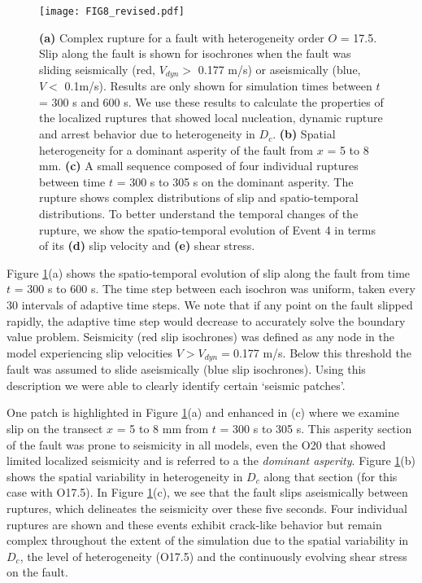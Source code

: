 \documentclass[preprint,1p, 10pt,authoryear]{elsarticle}
\begin{document}
\begin{figure}
	\centering
	\texttt{[image: FIG8\_revised.pdf]} 
	\caption{\textbf{(a)} Complex rupture for a fault with heterogeneity order $O$ = 17.5. Slip along the fault is shown for isochrones when the fault was sliding seismically (red, $V_{dyn}>$ 0.177 m/s) or aseismically (blue, $V <$ 0.1m/s).  Results are only shown for simulation times between $t$ = 300 s and 600 s. We use these results to calculate the properties of the localized ruptures that showed local nucleation, dynamic rupture and arrest behavior due to heterogeneity in $D_{c}$. \textbf{(b)} Spatial heterogeneity for a dominant asperity of the fault from $x$ = 5 to 8 mm. \textbf{(c)} A small sequence composed of four individual ruptures between time $t$ = 300 s to 305 s on the dominant asperity. The rupture shows complex distributions of slip and spatio-temporal distributions. To better understand the temporal changes of the rupture, we show the spatio-temporal evolution of Event 4 in terms of its \textbf{(d)} slip velocity and \textbf{(e)} shear stress.}
	\label{fig8}
\end{figure}

Figure \ref{fig8}(a) shows the spatio-temporal evolution of slip along the fault from time $t$ = 300 s to 600 s. The time step between each isochron was uniform, taken every 30 intervals of adaptive time steps.  We note that if any point on the fault slipped rapidly, the adaptive time step would decrease to accurately solve the boundary value problem. Seismicity (red slip isochrones) was defined as any node in the model experiencing slip velocities $V > V_{dyn}=$0.177 m/s. Below this threshold the fault was assumed to slide aseismically (blue slip isochrones). Using this description we were able to clearly identify certain `seismic patches'.

One patch is highlighted in Figure \ref{fig8}(a) and enhanced in (c) where we examine slip on the transect $x$ = 5 to 8 mm from $t$ = 300 s to 305 s.  This asperity section of the fault was prone to seismicity in all models, even the O20 that showed limited localized seismicity and is referred to a the \textit{dominant asperity}. Figure \ref{fig8}(b) shows the spatial variability in heterogeneity in $D_{c}$ along that section (for this case with O17.5). In Figure \ref{fig8}(c), we see that the fault slips aseismically between ruptures, which delineates the seismicity over these five seconds. Four individual ruptures are shown and these events exhibit crack-like behavior but remain complex throughout the extent of the simulation due to the spatial variability in $D_{c}$, the level of heterogeneity (O17.5) and the continuously evolving shear stress on the fault.
\end{document}
